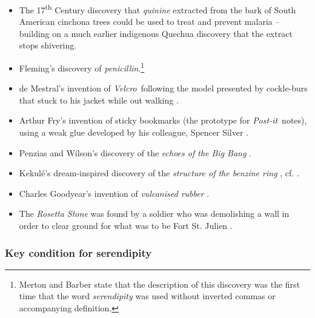 \begin{itemize}
\item The 17\textsuperscript{th} Century discovery that \emph{quinine} extracted from
  the bark of South American cinchona trees could be used to treat and
  prevent malaria -- building on a much earlier indigenous Quechua
  discovery that the extract stops shivering.
\item Fleming's discovery of {\em penicillin}.\footnote{Merton and
  Barber \citeyear{merton} state that the description of this discovery
  was the first time that the word \emph{serendipity} was used without
  inverted commas or accompanying definition.}
\item de Mestral's invention of {\em Velcro}\texttrademark\ following
  the model presented by cockle-burs that stuck to his jacket while
  out walking \cite[pp 220-222]{roberts}.
\item Arthur Fry's invention of sticky bookmarks (the prototype for
  {\em Post-it}\texttrademark\ notes), using a weak glue developed by
  his colleague, Spencer Silver \cite[p. 224]{roberts}.
\item Penzias and Wilson's discovery of the {\em echoes of the Big
  Bang} \cite{singh2004big}.
\item Kekul\'e's dream-inspired discovery of the {\em structure of the
  benzine ring} \cite[p. 21]{benfey}, cf. \cite[p. 77]{roberts}.
\item Charles Goodyear's invention of {\em vulcanised rubber}
  \cite{goodyear1855gum}.
\item The {\em Rosetta Stone} was found by a soldier who was
  demolishing a wall in order to clear ground for what was to be Fort
  St. Julien \cite[pp. 109 - 111]{roberts}.
\end{itemize}

\subsubsection*{Key condition for serendipity}

